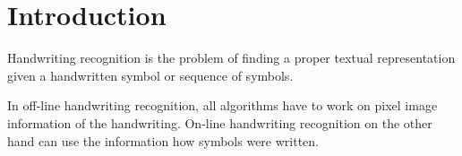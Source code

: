 
\chapter{Introduction}
\label{ch:Introduction}

Handwriting recognition is the problem of finding a proper textual representation
given a handwritten symbol or sequence of symbols.

In off-line handwriting recognition, all algorithms have to work on pixel image
information of the handwriting. On-line handwriting recognition on the other
hand can use the information how symbols were written.

